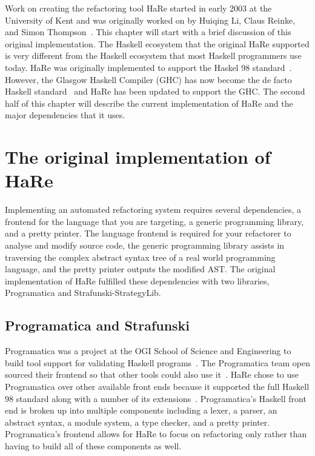 
Work on creating the refactoring tool HaRe started in early 2003 at the University of Kent and was originally worked on by Huiqing Li, Claus Reinke, and Simon Thompson~\citep{refacWebsite}. This chapter will start with a brief discussion of this original implementation. The Haskell ecosystem that the original HaRe supported is very different from the Haskell ecosystem that most Haskell programmers use today. HaRe was originally implemented to support the Haskel 98 standard~\citep{huiqingThesis}. However, the Glasgow Haskell Compiler (GHC) has now become the de facto Haskell standard~\citep{refacTools} and HaRe has been updated to support the GHC. The second half of this chapter will describe the current implementation of HaRe and the major dependencies that it uses. 

\section{The original implementation of HaRe}

Implementing an automated refactoring system requires several dependencies, a frontend for the language that you are targeting, a generic programming library, and a pretty printer. The language frontend is required for your refactorer to analyse and modify source code, the generic programming library assists in traversing the complex abstract syntax tree of a real world programming language, and the pretty printer outputs the modified AST. The original implementation of HaRe fulfilled these dependencies with two libraries, Programatica and Strafunski-StrategyLib. 

\subsection{Programatica and Strafunski}\label{prog&Strafunski}

Programatica was a project at the OGI School of Science and Engineering to build tool support for validating Haskell programs~\cite{programaticaTools}. The Programatica team open sourced their frontend so that other tools could also use it~\citep{refacWebsite}. HaRe chose to use Programatica over other available front ends because it supported the full Haskell 98 standard along with a number of its extensions~\citep{huiqingThesis}. Programatica's Haskell front end is broken up into multiple components including a lexer, a parser, an abstract syntax, a module system, a type checker, and a pretty printer. Programatica's frontend allows for HaRe to focus on refactoring only rather than having to build all of these components as well.

